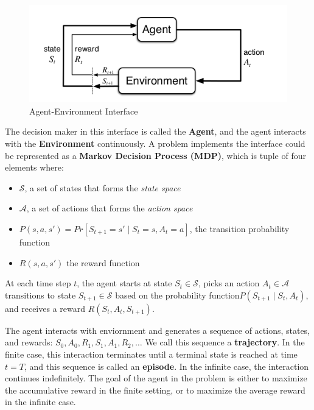 \documentclass[12pt]{article}
\newcommand{\note}[1]{\todo[color=yellow!40,bordercolor=none,linecolor=black]{#1}}
\begin{document}
\begin{figure}[h]
    \centering
    \includegraphics[scale=0.5]{assets/agent_environment_interface.png}
    \caption[]{Agent-Environment Interface}
    \label{fig:agent_environment_interface}
\end{figure}

The decision maker in this interface is called the \textbf{Agent}, and the agent interacts with the \textbf{Environment} continuously.
A problem implements the interface could be represented as a \textbf{Markov Decision Process (MDP)}, which is tuple of four elements where:
\begin{itemize}
    \item $\mathcal{S}$, a set of states that forms the \textit{state space}
    \item $\mathcal{A}$, a set of actions that forms the \textit{action space}
    \item $P(s, a, s') = Pr[ S_{t+1} = s' \mid  S_t = s, A_t = a]$, the transition probability function
    \item $R(s, a, s')$ the reward function
\end{itemize}
At each time step $t$, the agent starts at state $S_t \in \mathcal{S}$, picks an action $A_t \in \mathcal{A}$
transitions to state $S_{t+1} \in \mathcal{S}$ based on the probability function$P(S_{t+1} \mid S_t, A_t)$,
and receives a reward $R(S_t, A_t, S_{t+1})$.

The agent interacts with enviornment and generates a sequence of actions, states, and rewards:
$S_{0}, A_{0}, R_{1}, S_{1}, A_{1}, R_{2}, \dots$
We call this sequence a \textbf{trajectory}.
In the finite case, this interaction terminates until a terminal state is reached at time $t = T$, and this sequence is called an \textbf{episode}.
In the infinite case, the interaction continues indefinitely.
The goal of the agent in the problem is either to maximize the accumulative reward in the finite setting,
or to maximize the average reward in the infinite case.

\note{also describes policy $\pi$}
\end{document}
